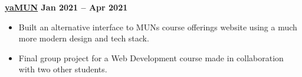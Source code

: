 \textbf{\href{https://github.com/jackharrhy/yaMUN}{yaMUN} \hfill Jan 2021 -- Apr 2021}\par
\begin{itemize}
	\item Built an alternative interface to MUNs course offerings website using a much more modern design and tech stack.
	\item Final group project for a Web Development course made in collaboration with two other students.
\end{itemize}\vspace{0.1cm}\par